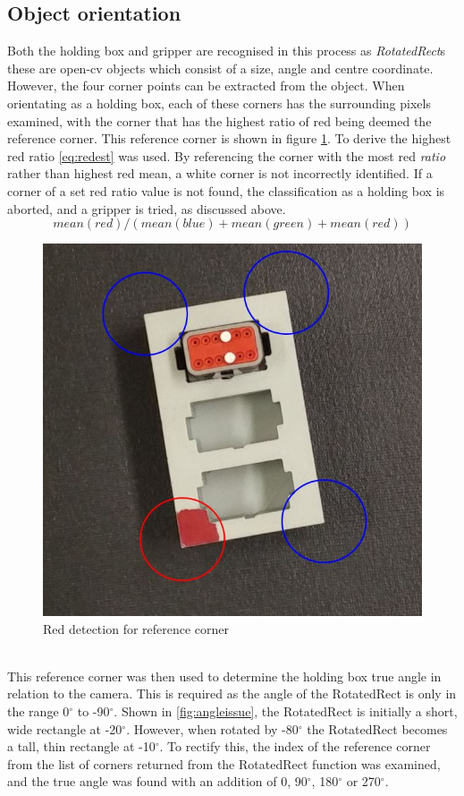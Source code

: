 \documentclass[11pt,a4paper]{report}
\begin{document}
\subsection{Object orientation}

Both the holding box and gripper are recognised in this process as \mbox{\textit{RotatedRect}s} these are open-cv objects which consist of a size, angle and centre coordinate. However, the four corner points can be extracted from the object. When orientating as a holding box, each of these corners has the surrounding pixels examined, with the corner that has the highest ratio of red being deemed the reference corner. This reference corner is shown in figure \cref{fig:Redest}. To derive the highest red ratio \cref{eq:redest} was used. By referencing the corner with the most red \textit{ratio} rather than highest red mean, a white corner is not incorrectly identified. If a corner of a set red ratio value is not found, the classification as a holding box is aborted, and a gripper is tried, as discussed above.
\begin{equation}
mean(red)/(mean(blue)+mean(green)+mean(red))
\label{eq:redest}
\end{equation}
\begin{figure}[h]
	\centering
	\includegraphics[width=0.3\linewidth]{Redest}
	\caption{Red detection for reference corner}
	\label{fig:Redest}\end{figure}\\

This reference corner was then used to determine the holding box true angle in relation to the camera. This is required as the angle of the RotatedRect is only in the range 0$^{\circ}$ to -90$^{\circ}$. Shown in  \cref{fig:angleissue}, the RotatedRect is initially a short, wide rectangle at -20$^{\circ}$. However, when rotated by -80$^{\circ}$ the RotatedRect becomes a tall, thin rectangle at -10$^{\circ}$. To rectify this, the index of the reference corner from the list of corners returned from the RotatedRect function was examined, and the true angle was found with an addition of 0, 90$^{\circ}$, 180$^{\circ}$ or 270$^{\circ}$. 
\end{document}
